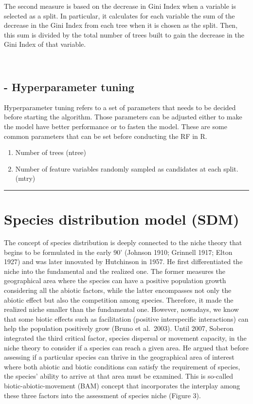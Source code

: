 \documentclass[
]{article}
\begin{document}
The second measure is based on the decrease in Gini Index when a
variable is selected as a split. In particular, it calculates for each
variable the sum of the decrease in the Gini Index from each tree when
it is chosen as the split. Then, this sum is divided by the total number
of trees built to gain the decrease in the Gini Index of that variable.

~

\hypertarget{hyperparameter-tuning}{%
\subsection{- Hyperparameter tuning}\label{hyperparameter-tuning}}

Hyperparameter tuning refers to a set of parameters that needs to be
decided before starting the algorithm. Those parameters can be adjusted
either to make the model have better performance or to fasten the model.
These are some common parameters that can be set before conducting the
RF in R.

\begin{enumerate}
\def\labelenumi{\arabic{enumi}.}
\item
  Number of trees (ntree)
\item
  Number of feature variables randomly sampled as candidates at each
  split. (mtry)
\end{enumerate}

\begin{center}\rule{0.5\linewidth}{0.5pt}\end{center}

\hypertarget{species-distribution-model-sdm}{%
\section{Species distribution model
(SDM)}\label{species-distribution-model-sdm}}

The concept of species distribution is deeply connected to the niche
theory that begins to be formulated in the early 90' (Johnson 1910;
Grinnell 1917; Elton 1927) and was later innovated by Hutchinson in
1957. He first differentiated the niche into the fundamental and the
realized one. The former measures the geographical area where the
species can have a positive population growth considering all the
abiotic factors, while the latter encompasses not only the abiotic
effect but also the competition among species. Therefore, it made the
realized niche smaller than the fundamental one. However, nowadays, we
know that some biotic effects such as facilitation (positive
interspecific interactions) can help the population positively grow
(Bruno et al.~2003). Until 2007, Soberon integrated the third critical
factor, species dispersal or movement capacity, in the niche theory to
consider if a species can reach a given area. He argued that before
assessing if a particular species can thrive in the geographical area of
interest where both abiotic and biotic conditions can satisfy the
requirement of species, the species' ability to arrive at that area must
be examined. This is so-called biotic-abiotic-movement (BAM) concept
that incorporates the interplay among these three factors into the
assessment of species niche (Figure 3).
\end{document}
